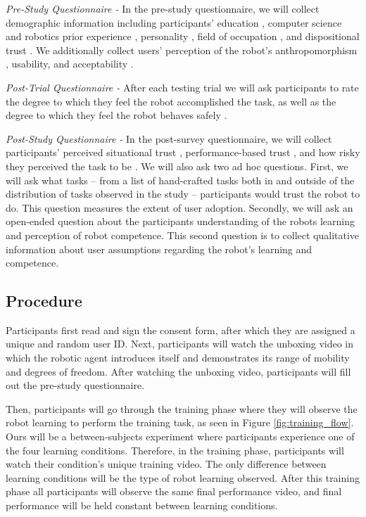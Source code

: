 \documentclass[letterpaper]{article} %
\begin{document}
\textit{Pre-Study Questionnaire -} In the pre-study questionnaire, we will collect demographic information including participants' education \cite{raub_correlates_nodate}, computer science and robotics prior experience \cite{raub_correlates_nodate}, personality \cite{donnellan_mini-ipip_2006}, field of occupation \cite{noauthor_college_nodate}, and dispositional trust \cite{merritt_i_2013}. We additionally collect users' perception of the robot's anthropomorphism \cite{bartneck_measurement_2009}, usability, and acceptability \cite{belanche_integrating_2012}.

\textit{Post-Trial Questionnaire -}
After each testing trial we will ask participants to rate the degree to which they feel the robot accomplished the task, as well as the degree to which they feel the robot behaves safely \cite{bartneck_measurement_2009}.

\textit{Post-Study Questionnaire -}
In the post-survey questionnaire, we will collect participants' perceived situational trust \cite{jian_foundations_2000}, performance-based trust \cite{malle_multidimensional_2021}, and how risky they perceived the task to be \cite{fischhoff_how_1978}. We will also ask two ad hoc questions. First, we will ask what tasks -- from a list of hand-crafted tasks both in and outside of the distribution of tasks observed in the study -- participants would trust the robot to do. This question measures the extent of user adoption. Secondly, we will ask an open-ended question about the participants understanding of the robots learning and perception of robot competence. This second question is to collect qualitative information about user assumptions regarding the robot's learning and competence.

\subsection{Procedure}
\label{sec:procedure}
Participants first read and sign the consent form, after which they are assigned a unique and random user ID. Next, participants will watch the unboxing video in which the robotic agent introduces itself and demonstrates its range of mobility and degrees of freedom. After watching the unboxing video, participants will fill out the pre-study questionnaire.

Then, participants will go through the training phase where they will observe the robot learning to perform the training task, as seen in Figure \ref{fig:training_flow}. Ours will be a between-subjects experiment where participants experience one of the four learning conditions. Therefore, in the training phase, participants will watch their condition's unique training video. The only difference between learning conditions will be the type of robot learning observed. After this training phase all participants will observe the same final performance video, and final performance will be held constant between learning conditions.
\end{document}
